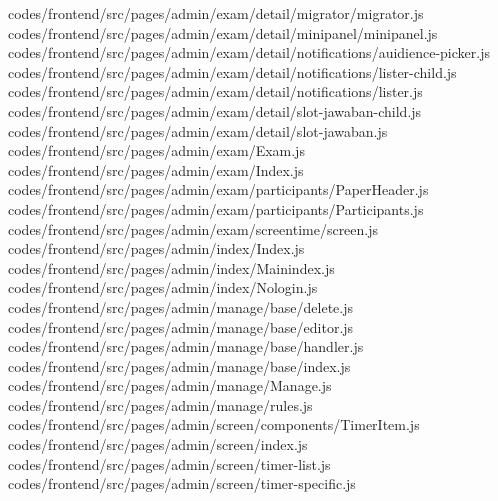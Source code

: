 codes/frontend/src/pages/admin/exam/detail/migrator/migrator.js
codes/frontend/src/pages/admin/exam/detail/minipanel/minipanel.js
codes/frontend/src/pages/admin/exam/detail/notifications/auidience-picker.js
codes/frontend/src/pages/admin/exam/detail/notifications/lister-child.js
codes/frontend/src/pages/admin/exam/detail/notifications/lister.js
codes/frontend/src/pages/admin/exam/detail/slot-jawaban-child.js
codes/frontend/src/pages/admin/exam/detail/slot-jawaban.js
codes/frontend/src/pages/admin/exam/Exam.js
codes/frontend/src/pages/admin/exam/Index.js
codes/frontend/src/pages/admin/exam/participants/PaperHeader.js
codes/frontend/src/pages/admin/exam/participants/Participants.js
codes/frontend/src/pages/admin/exam/screentime/screen.js
codes/frontend/src/pages/admin/index/Index.js
codes/frontend/src/pages/admin/index/Mainindex.js
codes/frontend/src/pages/admin/index/Nologin.js
codes/frontend/src/pages/admin/manage/base/delete.js
codes/frontend/src/pages/admin/manage/base/editor.js
codes/frontend/src/pages/admin/manage/base/handler.js
codes/frontend/src/pages/admin/manage/base/index.js
codes/frontend/src/pages/admin/manage/Manage.js
codes/frontend/src/pages/admin/manage/rules.js
codes/frontend/src/pages/admin/screen/components/TimerItem.js
codes/frontend/src/pages/admin/screen/index.js
codes/frontend/src/pages/admin/screen/timer-list.js
codes/frontend/src/pages/admin/screen/timer-specific.js
